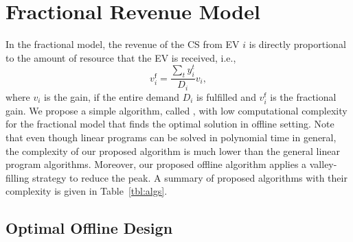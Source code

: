 \section{Fractional Revenue Model}
		\label{sec:fractional}


In the fractional model, the revenue of the CS from EV $i$ is directly proportional to the amount of resource that the EV is received, i.e.,
		\begin{equation}
			v_i^{\mathsf{f}}=\frac{\sum_t y_i^t}{D_i}v_i,
			\label{Eq:partial_value}
		\end{equation}
		where $v_i$ is the gain, if the entire demand $D_i$ is fulfilled and $v_i^{\mathsf{f}}$ is the fractional gain.  
We propose a simple algorithm, called \fcs, with low computational complexity  for the fractional model that finds the optimal solution in offline setting. Note that even though linear programs can be solved in polynomial time in general, the complexity of our proposed algorithm is much lower than the general linear program algorithms. Moreover, our proposed offline algorithm applies a valley-filling strategy to reduce the peak. 
A summary of proposed algorithms with their complexity is given in Table~\ref{tbl:algs}.		


\subsection{Optimal Offline Design}
\label{sec:fopt}	

